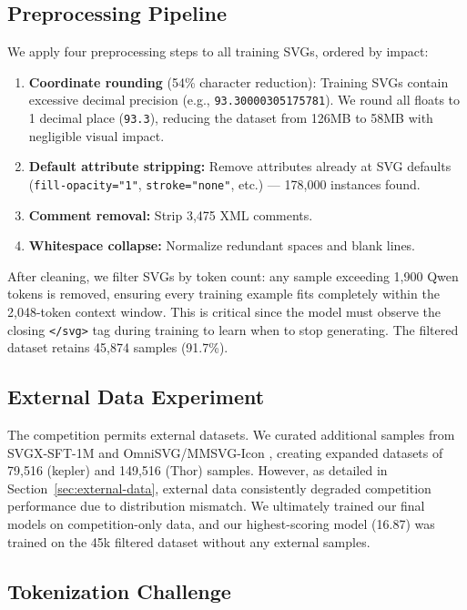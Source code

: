\documentclass[11pt]{article}
\begin{document}
\subsection{Preprocessing Pipeline}
\label{sec:preprocessing}

We apply four preprocessing steps to all training SVGs, ordered by impact:

\begin{enumerate}
    \item \textbf{Coordinate rounding} (54\% character reduction): Training SVGs contain excessive decimal precision (e.g., \texttt{93.30000305175781}). We round all floats to 1 decimal place (\texttt{93.3}), reducing the dataset from 126MB to 58MB with negligible visual impact.
    \item \textbf{Default attribute stripping:} Remove attributes already at SVG defaults (\texttt{fill-opacity="1"}, \texttt{stroke="none"}, etc.) --- 178,000 instances found.
    \item \textbf{Comment removal:} Strip 3,475 XML comments.
    \item \textbf{Whitespace collapse:} Normalize redundant spaces and blank lines.
\end{enumerate}

After cleaning, we filter SVGs by token count: any sample exceeding 1,900 Qwen tokens is removed, ensuring every training example fits completely within the 2,048-token context window. This is critical since the model must observe the closing \texttt{</svg>} tag during training to learn when to stop generating. The filtered dataset retains 45,874 samples (91.7\%).

\subsection{External Data Experiment}

The competition permits external datasets. We curated additional samples from SVGX-SFT-1M \citep{xingxm2024svgx} and OmniSVG/MMSVG-Icon \citep{omnisvg2024}, creating expanded datasets of 79,516 (kepler) and 149,516 (Thor) samples. However, as detailed in Section~\ref{sec:external-data}, external data consistently degraded competition performance due to distribution mismatch. We ultimately trained our final models on competition-only data, and our highest-scoring model (16.87) was trained on the 45k filtered dataset without any external samples.

\subsection{Tokenization Challenge}
\label{sec:tokenization}
\end{document}
